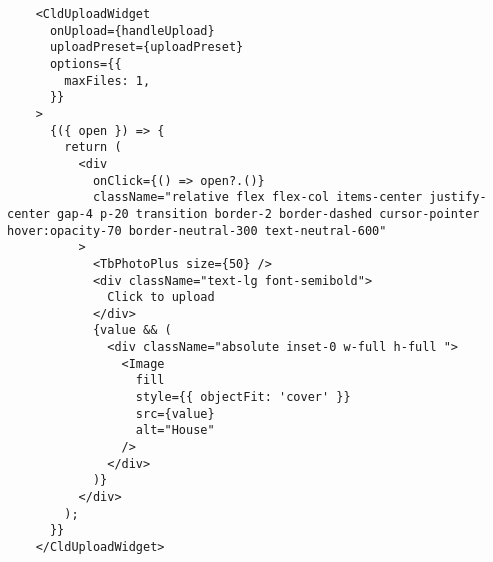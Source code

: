 \begin{verbatim}
    <CldUploadWidget
      onUpload={handleUpload}
      uploadPreset={uploadPreset}
      options={{
        maxFiles: 1,
      }}
    >
      {({ open }) => {
        return (
          <div
            onClick={() => open?.()}
            className="relative flex flex-col items-center justify-center gap-4 p-20 transition border-2 border-dashed cursor-pointer hover:opacity-70 border-neutral-300 text-neutral-600"
          >
            <TbPhotoPlus size={50} />
            <div className="text-lg font-semibold">
              Click to upload
            </div>
            {value && (
              <div className="absolute inset-0 w-full h-full ">
                <Image
                  fill
                  style={{ objectFit: 'cover' }}
                  src={value}
                  alt="House"
                />
              </div>
            )}
          </div>
        );
      }}
    </CldUploadWidget>
\end{verbatim}